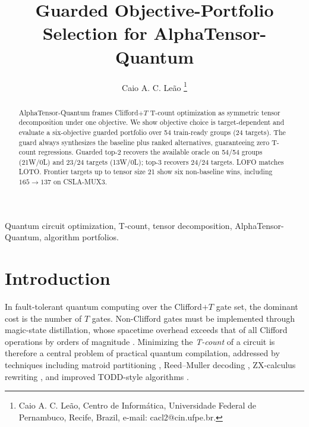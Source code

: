 \documentclass{cbctq}
\begin{document}
\title{Guarded Objective-Portfolio Selection for AlphaTensor-Quantum}

\author{
Caio A. C. Le\~ao%
\thanks{
Caio A. C. Le\~ao, Centro de Inform\'atica, Universidade Federal de Pernambuco, Recife, Brazil, e-mail: cacl2@cin.ufpe.br.
}
}

\maketitle


\begin{abstract}
AlphaTensor-Quantum frames Clifford$+T$ T-count optimization as symmetric tensor decomposition under one objective. We show objective choice is target-dependent and evaluate a six-objective guarded portfolio over 54 train-ready groups (24 targets). The guard always synthesizes the baseline plus ranked alternatives, guaranteeing zero T-count regressions. Guarded top-2 recovers the available oracle on 54/54 groups (21W/0L) and 23/24 targets (13W/0L); top-3 recovers 24/24 targets. LOFO matches LOTO. Frontier targets up to tensor size 21 show six non-baseline wins, including $165\to137$ on CSLA-MUX3.
\end{abstract}

\begin{keywords}
Quantum circuit optimization, T-count, tensor decomposition, AlphaTensor-Quantum, algorithm portfolios.
\end{keywords}

\section{Introduction}

In fault-tolerant quantum computing over the Clifford$+T$ gate set, the dominant cost is the number of $T$ gates. Non-Clifford gates must be implemented through magic-state distillation, whose spacetime overhead exceeds that of all Clifford operations by orders of magnitude \cite{bravyi2005,campbell2017}. Minimizing the \emph{T-count} of a circuit is therefore a central problem of practical quantum compilation, addressed by techniques including matroid partitioning \cite{amy2014}, Reed--Muller decoding \cite{heyfron2018}, ZX-calculus rewriting \cite{kissinger2020}, and improved TODD-style algorithms \cite{vandaele2025}.
\end{document}
